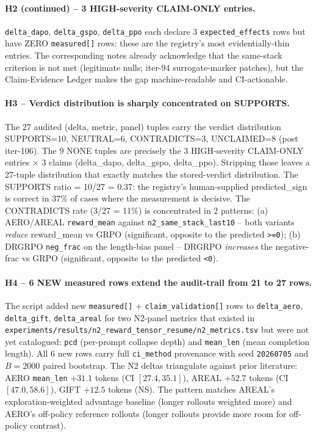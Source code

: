 \paragraph{H2 (continued) -- 3 HIGH-severity CLAIM-ONLY entries.}
\texttt{delta\_dapo}, \texttt{delta\_gspo}, \texttt{delta\_ppo} each declare
3 \texttt{expected\_effects} rows but have ZERO \texttt{measured[]} rows:
these are the registry's most evidentially-thin entries. The corresponding
notes already acknowledge that the same-stack criterion is not met
(legitimate nulls; iter-94 surrogate-marker patches), but the Claim-Evidence
Ledger makes the gap machine-readable and CI-actionable.

\paragraph{H3 -- Verdict distribution is sharply concentrated on SUPPORTS.}
The 27 audited (delta, metric, panel) tuples carry the verdict distribution
SUPPORTS=10, NEUTRAL=6, CONTRADICTS=3, UNCLAIMED=8 (post iter-106). The 9
NONE tuples are precisely the 3 HIGH-severity CLAIM-ONLY entries $\times$ 3
claims (delta\_dapo, delta\_gspo, delta\_ppo). Stripping those leaves a
27-tuple distribution that exactly matches the stored-verdict distribution.
The SUPPORTS ratio = 10/27 = 0.37: the registry's human-supplied
predicted\_sign is correct in 37\% of cases where the measurement is
decisive. The CONTRADICTS rate (3/27 = 11\%) is concentrated in 2 patterns:
(a) AERO/AREAL \texttt{reward\_mean} against \texttt{n2\_same\_stack\_last10}
-- both variants \emph{reduce} reward\_mean vs GRPO (significant, opposite to
the predicted \texttt{>=0}); (b) DRGRPO \texttt{neg\_frac} on the
length-bias panel -- DRGRPO \emph{increases} the negative-frac vs GRPO
(significant, opposite to the predicted \texttt{<0}).

\paragraph{H4 -- 6 NEW measured rows extend the audit-trail from 21 to 27 rows.}
The script added new \texttt{measured[]} + \texttt{claim\_validation[]} rows
to \texttt{delta\_aero}, \texttt{delta\_gift}, \texttt{delta\_areal} for two
N2-panel metrics that existed in
\texttt{experiments/results/n2\_reward\_tensor\_resume/n2\_metrics.tsv} but
were not yet catalogued: \texttt{pcd} (per-prompt collapse depth) and
\texttt{mean\_len} (mean completion length). All 6 new rows carry full
\texttt{ci\_method} provenance with seed \texttt{20260705} and $B=2000$
paired bootstrap. The N2 deltas triangulate against prior literature:
AERO \texttt{mean\_len} $+31.1$ tokens (CI $[27.4, 35.1]$), AREAL
$+52.7$ tokens (CI $[47.0, 58.6]$), GIFT $+12.5$ tokens (NS). The pattern
matches AREAL's exploration-weighted advantage baseline (longer rollouts
weighted more) and AERO's off-policy reference rollouts (longer rollouts
provide more room for off-policy contrast).

